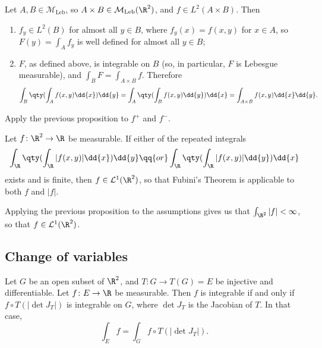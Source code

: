 \documentclass{maths}
\newcommand{\mleb}{\mathcal{M}_{\text{Leb}}}
\begin{document}
\begin{thm}
    Let $A,B\in\mleb$, so $A\times B\in\mleb(\R^2)$, and $f\in L^2(A\times B)$.
    Then
    \begin{enumerate}
        \item $f_y\in L^2(B)$ for almost all $y\in B$, where $f_y(x)=f(x,y)$ for $x\in A$, so $F(y)=\int_A f_y$ is well defined for almost all $y\in B$;
        \item $F$, as defined above, is integrable on $B$ (so, in particular, $F$ is Lebesgue measurable), and $\int_B F=\int_{A\times B} f$.
        Therefore
        \[
            \int_B \qty(\int_A f(x,y) \dd{x}) \dd{y} =
            \int_A \qty(\int_B f(x,y) \dd{y}) \dd{x} =
            \int_{A\times B} f(x,y) \dd{x} \dd{y}.
        \]
    \end{enumerate}
\end{thm}

\begin{prf}
    Apply the previous proposition to $f^+$ and $f^-$.
\end{prf}

\begin{thm}
    Let $f\colon\R^2\to\R$ be measurable.
    If either of the repeated integrals
    \[
        \int_\R \qty(\int_\R |f(x,y)| \dd{x}) \dd{y}
        \qq{or}
        \int_\R \qty(\int_\R |f(x,y)| \dd{y}) \dd{x}
    \]
    exists and is finite, then $f\in \mathcal{L}^1(\R^2)$, so that Fubini's Theorem is applicable to both $f$ and $|f|$.
\end{thm}

\begin{prf}
    Applying the previous proposition to the assumptions gives us that $\int_{\R^2}|f|<\infty$, so that $f\in \mathcal{L}^1(\R^2)$.
\end{prf}

\subsection{Change of variables}

\begin{thm}
    Let $G$ be an open subset of $\R^2$, and $T\colon G\to T(G)=E$ be injective and differentiable.
    Let $f\colon E\to\R$ be measurable.
    Then $f$ is integrable if and only if $f\circ T(|\det J_T|)$ is integrable on $G$, where $\det J_T$ is the Jacobian of $T$.
    In that case,
    \[
        \int_E f=
        \int_G f\circ T(|\det J_T|).
    \]
\end{thm}
\end{document}
